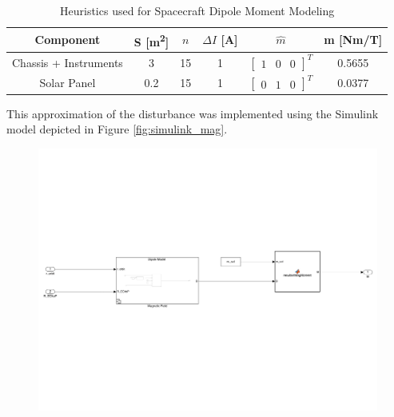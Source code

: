 \begin{table}[H]
    \centering
    \captionsetup{justification = centering}
    \begin{tabular}{c|ccccc}
    Component  & S [m\textsuperscript{2}] & $n$ & $\Delta I$ [A] & $\hat{m}$  & m [Nm/T] \\ \hline
    Chassis + Instruments &   3     &   15    &   1    &   $\begin{bmatrix}  1 & 0 & 0  \end{bmatrix}^T$    &  0.5655 \\
    Solar Panel &   0.2     &  15    &   1    &    $\begin{bmatrix}  0 & 1 & 0  \end{bmatrix}^T$   &  0.0377  \\  
    \end{tabular}
    \caption{Heuristics used for Spacecraft Dipole Moment Modeling}
    \label{tab:spacecraft_dipole_data}
\end{table}

This approximation of the disturbance was implemented using the Simulink model depicted in Figure \ref{fig:simulink_mag}.

\begin{figure}[H]
    \centering
    \includegraphics[trim={0.25cm 6cm 0.25cm 6cm},clip,width = 15cm]{Images/PS5/magneticField-1.png}
\end{figure}

